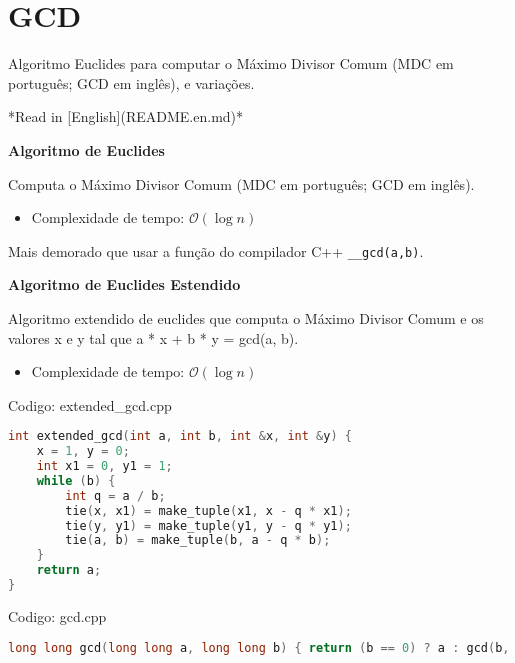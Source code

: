 \documentclass[10pt, a4paper, oneside]{book}
\begin{document}
\section{GCD}


Algoritmo Euclides para computar o Máximo Divisor Comum (MDC em português; GCD em inglês), e variações.



*Read in [English](README.en.md)*



\textbf{Algoritmo de Euclides} 



Computa o Máximo Divisor Comum (MDC em português; GCD em inglês).



\begin{itemize}
\item Complexidade de tempo: $\mathcal{O}(\log n)$
\end{itemize}



Mais demorado que usar a função do compilador C++ \texttt{\_\_gcd(a,b)}.



\textbf{Algoritmo de Euclides Estendido} 



Algoritmo extendido de euclides que computa o Máximo Divisor Comum e os valores x e y tal que a * x + b * y = gcd(a, b).



\begin{itemize}
\item Complexidade de tempo: $\mathcal{O}(\log n)$
\end{itemize}

\hfill

Codigo: extended\_gcd.cpp

\begin{lstlisting}[language=C++]
int extended_gcd(int a, int b, int &x, int &y) {
    x = 1, y = 0;
    int x1 = 0, y1 = 1;
    while (b) {
        int q = a / b;
        tie(x, x1) = make_tuple(x1, x - q * x1);
        tie(y, y1) = make_tuple(y1, y - q * y1);
        tie(a, b) = make_tuple(b, a - q * b);
    }
    return a;
}
\end{lstlisting}
\hfill

Codigo: gcd.cpp

\begin{lstlisting}[language=C++]
long long gcd(long long a, long long b) { return (b == 0) ? a : gcd(b, a % b); }
\end{lstlisting}
\hfill
\end{document}

